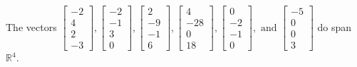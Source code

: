 \begin{exercise}
\begin{exerciseStatement}
  \end{exerciseStatement}
  \begin{exerciseAnswer}
   The vectors \(\left[\begin{array}{r}
-2 \\
4 \\
2 \\
-3
\end{array}\right] , \left[\begin{array}{r}
-2 \\
-1 \\
3 \\
0
\end{array}\right] , \left[\begin{array}{r}
2 \\
-9 \\
-1 \\
6
\end{array}\right] , \left[\begin{array}{r}
4 \\
-28 \\
0 \\
18
\end{array}\right] , \left[\begin{array}{r}
0 \\
-2 \\
-1 \\
0
\end{array}\right] , \text{ and } \left[\begin{array}{r}
-5 \\
0 \\
0 \\
3
\end{array}\right]\) 
  	 do  
	span \(\mathbb{R}^4\).
  


  \end{exerciseAnswer}
\end{exercise}